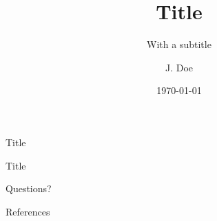 \documentclass[xcolor=x11names,compress,aspectratio=169]{beamer}
\title[Short title]{Title}
\subtitle{With a subtitle}
\author{J. Doe}
\institute[Short Institution]{Institution \\ Department}
\date{\today}
\begin{document}
\begin{frame}
\maketitle
\end{frame}

\begin{frame}{Title}

\end{frame}

\begin{frame}{Title}

\end{frame}

\begin{frame}{Questions?}
\end{frame}

\begin{frame}{References}


\end{frame}
\end{document}
